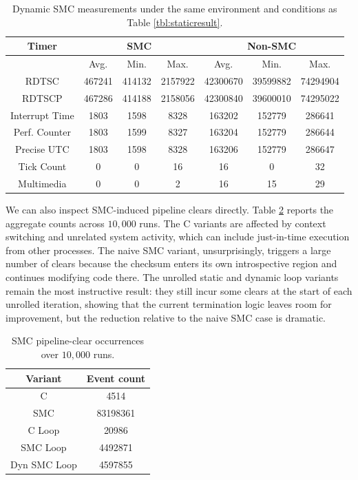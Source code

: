 \documentclass[11pt]{article}
\begin{document}
\begin{table}[t]
\centering
\small
\begin{tabular}{|c|c|c|c|c|c|c|}
\hline
Timer & \multicolumn{3}{c|}{SMC} & \multicolumn{3}{c|}{Non-SMC} \\ \hline
 & Avg. & Min. & Max. & Avg. & Min. & Max. \\ \hline
RDTSC & 467241 & 414132 & 2157922 & 42300670 & 39599882 & 74294904 \\ \hline
RDTSCP & 467286 & 414188 & 2158056 & 42300840 & 39600010 & 74295022 \\ \hline
Interrupt Time & 1803 & 1598 & 8328 & 163202 & 152779 & 286641 \\ \hline
Perf. Counter & 1803 & 1599 & 8327 & 163204 & 152779 & 286644 \\ \hline
Precise UTC & 1803 & 1598 & 8328 & 163206 & 152779 & 286647 \\ \hline
Tick Count & 0 & 0 & 16 & 16 & 0 & 32 \\ \hline
Multimedia & 0 & 0 & 2 & 16 & 15 & 29 \\ \hline
\end{tabular}
\caption{Dynamic SMC measurements under the same environment and conditions as Table \ref{tbl:staticresult}.}
\label{tbl:dynresult}
\end{table}

We can also inspect SMC-induced pipeline clears directly.  Table
\ref{tbl:smcevents} reports the aggregate counts across $10{,}000$ runs.  The C
variants are affected by context switching and unrelated system activity, which
can include just-in-time execution from other processes.  The naive SMC variant,
unsurprisingly, triggers a large number of clears because the checksum enters its
own introspective region and continues modifying code there.  The unrolled static
and dynamic loop variants remain the most instructive result: they still incur
some clears at the start of each unrolled iteration, showing that the current
termination logic leaves room for improvement, but the reduction relative to the
naive SMC case is dramatic.

\begin{table}[t]
\centering
\small
\begin{tabular}{|c|c|}
\hline
\textbf{Variant} & \textbf{Event count} \\ \hline
C & 4514 \\ \hline
SMC & 83198361 \\ \hline
C Loop & 20986 \\ \hline
SMC Loop & 4492871 \\ \hline
Dyn SMC Loop & 4597855 \\ \hline
\end{tabular}
\caption{SMC pipeline-clear occurrences over $10{,}000$ runs.}
\label{tbl:smcevents}
\end{table}
\end{document}

